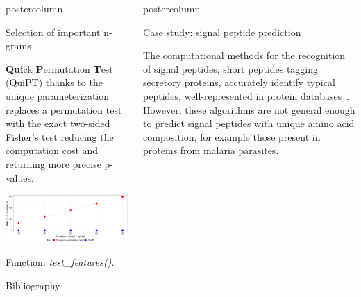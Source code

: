 \documentclass[final]{beamer}\usepackage[]{graphicx}\usepackage[]{color}
\makeatletter
\def\maxwidth{ %
  \ifdim\Gin@nat@width>\linewidth
    \linewidth
  \else
    \Gin@nat@width
  \fi
}
\newlength{\columnheight}
\makeatother
\begin{document}
\begin{frame}
\begin{columns}
\begin{column}{.51\textwidth}
\begin{beamercolorbox}[center,wd=\textwidth]{postercolumn}
\begin{minipage}[T]{.95\textwidth}
{\begin{block}{Selection of important n-grams}
\bigskip

\textbf{Qui}ck \textbf{P}ermutation \textbf{T}est (QuiPT) thanks to the unique 
parameterization replaces a permutation test with the exact two-sided Fisher's 
test reducing the computation cost and returning more precise p-values. 
  

\includegraphics[width=\maxwidth]{figure/unnamed-chunk-5-1} 


Function: \textit{test\_features()}.

    \end{block}
    \vfill


    \begin{block}{Bibliography}
    \tiny{
      
      
    }
    \end{block}
    \vfill 

}
\end{minipage}
\end{beamercolorbox}
\end{column}



\begin{column}{.50\textwidth}
\begin{beamercolorbox}[center,wd=\textwidth]{postercolumn}
\begin{minipage}[T]{.95\textwidth}  
\parbox[t][\columnheight]{\textwidth}
{

\begin{block}{Case study: signal peptide prediction}

The computational methods for the recognition of signal peptides, 
short peptides tagging secretory proteins, accurately identify typical peptides, 
well-represented in protein databases~\citep{petersen_signalp_2011}. However, 
these algorithms are not general enough to predict signal peptides with unique 
amino acid composition, for example those present in proteins from malaria 
parasites. 
\end{block}

}
\end{minipage}
\end{beamercolorbox}
\end{column}
\end{columns}
\end{frame}
\end{document}
